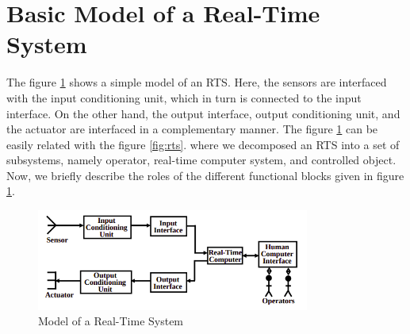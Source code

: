 \documentclass[12pt]{report}
\begin{document}
\section{Basic Model of a Real-Time System}
The figure \ref{fig:model} shows a simple model of an RTS. Here, the sensors are interfaced with the input conditioning unit, which in turn is connected to the input interface. On the other hand, the output interface, output conditioning unit, and the actuator are interfaced in a complementary manner. The figure \ref{fig:model} can be easily related with the figure \ref{fig:rts}. where we decomposed an RTS into a set of subsystems, namely operator, real-time computer system, and controlled object.  Now, we
briefly describe the roles of the different functional blocks given in figure \ref{fig:model}. 
\begin{figure}[h]
    \centering
    \includegraphics[width=0.8\textwidth]{images/model-rts.png}
    \caption{Model of a Real-Time System}
    \label{fig:model}
\end{figure}
\end{document}
